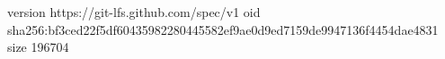 version https://git-lfs.github.com/spec/v1
oid sha256:bf3ced22f5df60435982280445582ef9ae0d9ed7159de9947136f4454dae4831
size 196704
